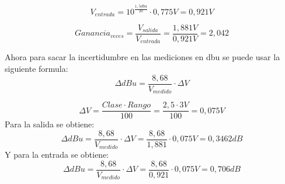 \begin{equation*}
    V_{entrada}=10^{\frac{1,5dbu}{20}} \cdot 0,775V=0,921V
\end{equation*}

\begin{equation*}
    Ganancia_{veces} =\frac{V_{salida}}{V_{entrada}}=\frac{1,881V}{0,921V}=2,042
\end{equation*}


\begin{table}[H]
\centering
{}

\end{table}

Ahora para sacar la incertidumbre en las mediciones en dbu se puede usar la siguiente formula:
\begin {equation*}
      \Delta dBu =\frac{8,68}{V_{medido}} \cdot \Delta V
\end{equation*}

\begin{equation*}
    \Delta V = \frac{Clase \cdot Rango}{100}=\frac{2,5\cdot 3V}{100}=0,075V
\end{equation*}
Para la salida se obtiene:
\begin{equation*}
    \Delta dBu =\frac{8,68}{V_{medido}} \cdot \Delta V= \frac{8,68}{1,881} \cdot 0,075V = 0,3462dB
\end{equation*}
Y para la entrada se obtiene:
\begin{equation*}
    \Delta dBu =\frac{8,68}{V_{medido}} \cdot \Delta V= \frac{8,68}{0,921} \cdot 0,075V = 0,706dB
\end{equation*}


\begin{table}[H]
\centering
{}
\end{table}


